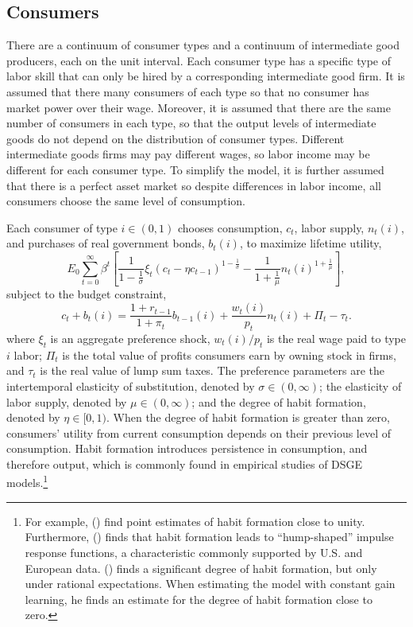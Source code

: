 \documentclass[10pt]{article}
\newcommand{\beq}{\begin{equation}}
\newcommand{\eeq}{\end{equation}}
\newcommand{\citee}[1]{\citeauthor*{#1} (\citeyear{#1})}
\begin{document}
\subsection{Consumers}
There are a continuum of consumer types and a continuum of intermediate good producers, each on the unit interval.  Each consumer type has a specific type of labor skill that can only be hired by a corresponding intermediate good firm.  It is assumed that there many consumers of each type so that no consumer has market power over their wage.  Moreover, it is assumed that there are the same number of consumers in each type, so that the output levels of intermediate goods do not depend on the distribution of consumer types.  Different intermediate goods firms may pay different wages, so labor income may be different for each consumer type.  To simplify the model, it is further assumed that there is a perfect asset market so despite differences in labor income, all consumers choose the same level of consumption.

Each consumer of type $i\in(0,1)$ chooses consumption, $c_t$, labor supply, $n_t(i)$, and purchases of real government bonds, $b_{t}(i)$, to maximize lifetime utility,
\beq \label{eq:util} E_0 \sum_{t=0}^{\infty} \beta^t \left[ \frac{1}{1-\frac{1}{\sigma}} \xi_t \left(c_t - \eta c_{t-1}\right)^{1-\frac{1}{\sigma}} - \frac{1}{1+\frac{1}{\mu}} n_t(i)^{1+\frac{1}{\mu}} \right], \eeq
subject to the budget constraint, 
\beq \label{eq:bc} c_t + b_t(i) = \frac{1+r_{t-1}}{1+\pi_t} b_{t-1}(i) + \frac{w_t(i)}{p_t} n_t(i) + \Pi_t - \tau_t. \eeq
where $\xi_t$ is an aggregate preference shock, $w_t(i)/p_t$ is the real wage paid to type $i$ labor; $\Pi_t$ is the total value of profits consumers earn by owning stock in firms, and $\tau_t$ is the real value of lump sum taxes.  The preference parameters are the intertemporal elasticity of substitution, denoted by $\sigma \in (0,\infty)$; the elasticity of labor supply, denoted by $\mu \in (0, \infty)$; and the degree of habit formation, denoted by $\eta \in [0,1)$.  When the degree of habit formation is greater than zero, consumers' utility from current consumption depends on their previous level of consumption.  Habit formation introduces persistence in consumption, and therefore output, which is commonly found in empirical studies of DSGE models.\footnote{For example, \citee{smetswouters2005} find point estimates of habit formation close to unity.  Furthermore, \citee{fuhrer2000} finds that habit formation leads to ``hump-shaped'' impulse response functions, a characteristic commonly supported by U.S. and European data.  \citee{milani2007} finds a significant degree of habit formation, but only under rational expectations.  When estimating the model with constant gain learning, he finds an estimate for the degree of habit formation close to zero.}   
\end{document}
